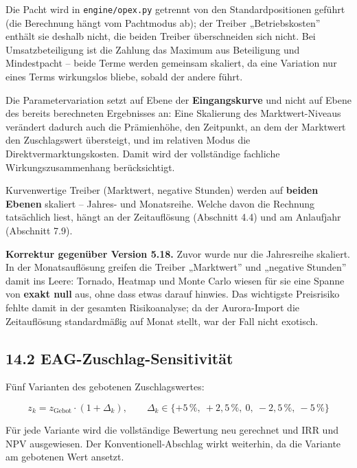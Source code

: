 \documentclass[
  a4paper,
  10pt]{article}
\renewenvironment{quote}
  {\begin{tcolorbox}[
      enhanced,
      breakable,
      colback=Wash,
      colframe=Brand,
      boxrule=0pt,
      leftrule=2.2pt,
      arc=0pt,
      left=8pt,right=8pt,top=6pt,bottom=6pt,
      before skip=8pt,after skip=9pt
    ]\small\color{InkSoft}}
  {\end{tcolorbox}}
\begin{document}
Die Pacht wird in \nolinkurl{engine/opex.py} getrennt von den
Standardpositionen geführt (die Berechnung hängt vom Pachtmodus ab); der
Treiber „Betriebskosten'' enthält sie deshalb nicht, die beiden Treiber
überschneiden sich nicht. Bei Umsatzbeteiligung ist die Zahlung das
Maximum aus Beteiligung und Mindestpacht -- beide Terme werden gemeinsam
skaliert, da eine Variation nur eines Terms wirkungslos bliebe, sobald
der andere führt.

Die Parametervariation setzt auf Ebene der \textbf{Eingangskurve} und
nicht auf Ebene des bereits berechneten Ergebnisses an: Eine Skalierung
des Marktwert-Niveaus verändert dadurch auch die Prämienhöhe, den
Zeitpunkt, an dem der Marktwert den Zuschlagswert übersteigt, und im
relativen Modus die Direktvermarktungskosten. Damit wird der
vollständige fachliche Wirkungszusammenhang berücksichtigt.

Kurvenwertige Treiber (Marktwert, negative Stunden) werden auf
\textbf{beiden Ebenen} skaliert -- Jahres- und Monatsreihe. Welche davon
die Rechnung tatsächlich liest, hängt an der Zeitauflösung (Abschnitt
4.4) und am Anlaufjahr (Abschnitt 7.9).

\begin{quote}
\textbf{Korrektur gegenüber Version 5.18.} Zuvor wurde nur die
Jahresreihe skaliert. In der Monatsauflösung greifen die Treiber
„Marktwert'' und „negative Stunden'' damit ins Leere: Tornado, Heatmap
und Monte Carlo wiesen für sie eine Spanne von \textbf{exakt null} aus,
ohne dass etwas darauf hinwies. Das wichtigste Preisrisiko fehlte damit
in der gesamten Risikoanalyse; da der Aurora-Import die Zeitauflösung
standardmäßig auf Monat stellt, war der Fall nicht exotisch.
\end{quote}

\hypertarget{eag-zuschlag-sensitivituxe4t}{%
\subsection{14.2
EAG-Zuschlag-Sensitivität}\label{eag-zuschlag-sensitivituxe4t}}

Fünf Varianten des gebotenen Zuschlagswertes:

\[ z_k = z_{\mathrm{Gebot}} \cdot (1 + \Delta_k), \qquad \Delta_k \in \{+5\,\%,\ +2{,}5\,\%,\ 0,\ -2{,}5\,\%,\ -5\,\%\} \]

Für jede Variante wird die vollständige Bewertung neu gerechnet und IRR
und NPV ausgewiesen. Der Konventionell-Abschlag wirkt weiterhin, da die
Variante am gebotenen Wert ansetzt.
\end{document}
